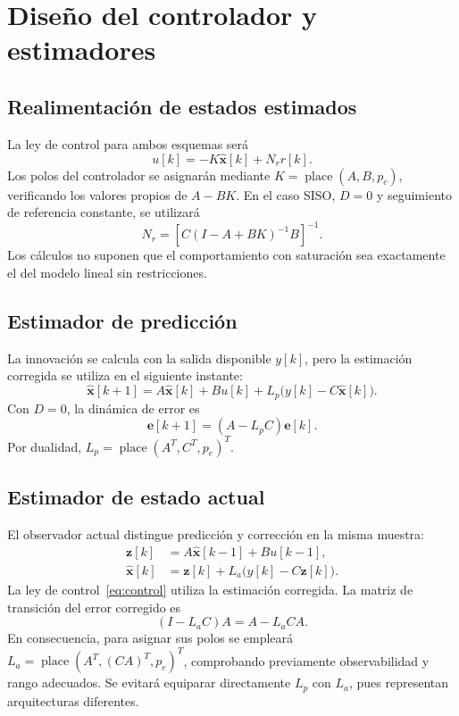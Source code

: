 \section{Diseño del controlador y estimadores}
\subsection{Realimentación de estados estimados}
La ley de control para ambos esquemas será
\begin{equation}\label{eq:control}
 u[k]=-K\widehat{\mathbf{x}}[k]+N_r r[k].
\end{equation}
Los polos del controlador se asignarán mediante \(K=\operatorname{place}
(A,B,p_c)\), verificando los valores propios de \(A-BK\). En el caso
SISO, \(D=0\) y seguimiento de referencia constante, se utilizará
\begin{equation}
 N_r=\left[C(I-A+BK)^{-1}B\right]^{-1}.
\end{equation}
Los cálculos no suponen que el comportamiento con saturación sea exactamente
el del modelo lineal sin restricciones.

\subsection{Estimador de predicción}
La innovación se calcula con la salida disponible \(y[k]\), pero la
estimación corregida se utiliza en el siguiente instante:
\begin{equation}\label{eq:predictor}
\widehat{\mathbf{x}}[k+1]=A\widehat{\mathbf{x}}[k]+Bu[k]
 +L_p\big(y[k]-C\widehat{\mathbf{x}}[k]\big).
\end{equation}
Con \(D=0\), la dinámica de error es
\begin{equation}
 \mathbf e[k+1]=(A-L_pC)\mathbf e[k].
\end{equation}
Por dualidad, \(L_p=\operatorname{place}(A^T,C^T,p_e)^T\).

\subsection{Estimador de estado actual}
El observador actual distingue predicción y corrección en la misma muestra:
\begin{align}
\mathbf z[k]&=A\widehat{\mathbf{x}}[k-1]+Bu[k-1],\\
\widehat{\mathbf{x}}[k]&=\mathbf z[k]+L_a\big(y[k]-C\mathbf z[k]\big).
\end{align}
La ley de control~\eqref{eq:control} utiliza la estimación corregida.
La matriz de transición del error corregido es
\begin{equation}
 (I-L_a C)A=A-L_a C A.
\end{equation}
En consecuencia, para asignar sus polos se empleará
\(L_a=\operatorname{place}(A^T,(CA)^T,p_e)^T\), comprobando previamente
observabilidad y rango adecuados. Se evitará equiparar directamente
\(L_p\) con \(L_a\), pues representan arquitecturas diferentes.


